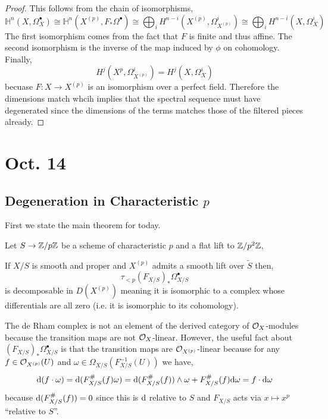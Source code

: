 \documentclass[12pt]{article}
\begin{document}
\begin{proof}
This follows from the chain of isomorphisms,
\[ \mathbb{H}^n(X, \Omega^\bullet_X) \cong \mathbb{H}^n(X^{(p)}, F_* \Omega^\bullet) \cong \bigoplus_{i} H^{n-i}(X^{(p)}, \Omega^i_{X^{(p)}}) \cong \bigoplus_{i} H^{n-i}(X, \Omega^i_X) \]
The first isomorphism comes from the fact that $F$ is finite and thus affine. The second isomorphism is the inverse of the map induced by $\phi$ on cohomology. Finally,
\[ H^{j}(X^{p}, \Omega^i_{X^{(p)}}) = H^{j}(X, \Omega^i_X) \]
becuase $F : X \to X^{(p)}$ is an isomorphism over a perfect field. 
Therefore the dimensions match whcih implies that the spectral sequence must have degenerated since the dimensions of the terms matches those of the filtered pieces already.
\end{proof}

\section{Oct. 14}

\subsection{Degeneration in Characteristic $p$}

First we state the main theorem for today.

\begin{thm}
Let $S \to \mathbb{Z} / p \mathbb{Z}$ be a scheme of characteristic $p$ and a flat lift to $\mathbb{Z} / p^2 \mathbb{Z}$,
\begin{center}
\end{center}
If $X/S$ is smooth and proper and $X^{(p)}$ admits a smooth lift over $\tilde{S}$ then,
\[ \tau_{< p} (F_{X/S})_* \Omega^\bullet_{X/S} \]
is decomposable in $D(X^{(p)})$ meaning it is isomorphic to a complex whose differentials are all zero (i.e. it is isomorphic to its cohomology).
\end{thm}

\begin{rmk}
The de Rham complex is not an element of the derived category of $\mathcal{O}_{X}$-modules because the transition maps are not $\mathcal{O}_{X}$-linear. However, the useful fact about $(F_{X/S})_* \Omega_{X/S}^\bullet$ is that the transition maps are $\mathcal{O}_{X^{(p)}}$-linear because for any $f \in \mathcal{O}_{X^{(p)}}(U)$ and $\omega \in \Omega_{X/S}(F_{X/S}^{-1}(U))$ we have,
\[ \mathrm{d}{(f \cdot \omega)} = \mathrm{d}{(F_{X/S}^\#(f) \omega)} = \mathrm{d}{(F_{X/S}^\#(f))} \wedge \omega + F_{X/S}^\#(f) \mathrm{d}{\omega} = f \cdot \mathrm{d}{\omega} \]
because $\mathrm{d}{(F_{X/S}^\#(f))} = 0$ since this is $\mathrm{d}$ relative to $S$ and $F_{X/S}$ acts via $x \mapsto x^p$ ``relative to $S$''.
\end{rmk}
\end{document}
